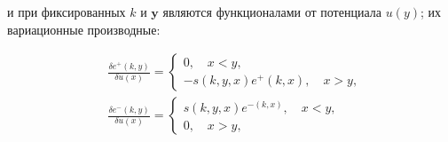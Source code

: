 \documentclass[10pt]{article}
\begin{document}
и при фиксированных $k$ и $\boldsymbol{y}$ являются функционалами от потенциала $u(y)$; их вариационные производные:



\[

\begin{aligned}

& \frac{\delta e^{+}(k, y)}{\delta u(x)}=\left\{\begin{array}{l}

0, \quad x<y, \\

-s(k, y, x) e^{+}(k, x), \quad x>y,

\end{array}\right. \\

& \frac{\delta e^{-}(k, y)}{\delta u(x)}=\left\{\begin{array}{l}

s(k, y, x) e^{-(k, x)}, \quad x<y, \\

0, \quad x>y,

\end{array}\right.

\end{aligned}

\]
\end{document}
